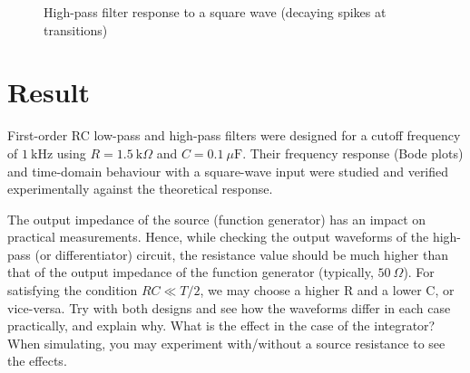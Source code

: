 \begin{figure}[ht!]
	\centering
	\caption{High-pass filter response to a square wave (decaying spikes at transitions)}
	\label{fig:waveform-hpf}
\end{figure}

\section{Result}
First-order RC low-pass and high-pass filters were designed for a cutoff
frequency of $1\ \text{kHz}$ using $R = 1.5\ \text{k}\Omega$ and
$C = 0.1\ \mu\text{F}$. Their frequency response (Bode plots) and time-domain
behaviour with a square-wave input were studied and verified experimentally
against the theoretical response.
\begin{explorebox}
	The output impedance of the source (function generator) has an impact on practical measurements. Hence, while checking the output waveforms of the high-pass (or differentiator) circuit, the resistance value should be much higher than that of the output impedance of the function generator (typically, $50\ \Omega$). For satisfying the condition $RC \ll T/2$, we may choose a higher R and a lower C, or vice-versa. Try with both designs and see how the waveforms differ in each case practically, and explain why. What is the effect in the case of the integrator? When simulating, you may experiment with/without a source resistance to see the effects.
\end{explorebox}

